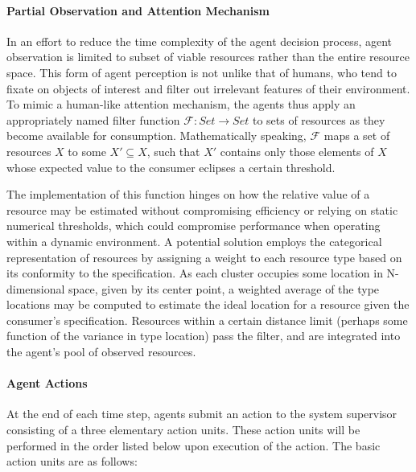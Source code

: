 \documentclass{article}
\theoremstyle{definition}
\theoremstyle{remark}
\newcommand{\func}[3]{#1:#2\rightarrow#3}
\begin{document}
			\paragraph{Partial Observation and Attention Mechanism}
			
			In an effort to reduce the time complexity of the agent decision process, agent observation is limited to subset of viable resources rather than the entire resource space. This form of agent perception is not unlike that of humans, who tend to fixate on objects of interest and filter out irrelevant features of their environment. To mimic a human-like attention mechanism, the agents thus apply an appropriately named filter function $\func{\mathcal{F}}{Set}{Set}$ to sets of resources as they become available for consumption. Mathematically speaking, $\mathcal{F}$ maps a set of resources $X$ to some $X' \subseteq X$, such that $X'$ contains only those elements of $X$ whose expected value to the consumer eclipses a certain threshold. 
			
			The implementation of this function hinges on how the relative value of a resource may be estimated without compromising efficiency or relying on static numerical thresholds, which could compromise performance when operating within a dynamic environment. A potential solution employs the categorical representation of resources by assigning a weight to each resource type based on its conformity to the specification. As each cluster occupies some location in N-dimensional space, given by its center point, a weighted average of the type locations may be computed to estimate the ideal location for a resource given the consumer's specification. Resources within a certain distance limit (perhaps some function of the variance in type location) pass the filter, and are integrated into the agent's pool of observed resources.

			\paragraph{Agent Actions}

			At the end of each time step, agents submit an action to the system supervisor consisting of a three elementary action units. These action units will be performed in the order listed below upon execution of the action. The basic action units are as follows:
\end{document}
